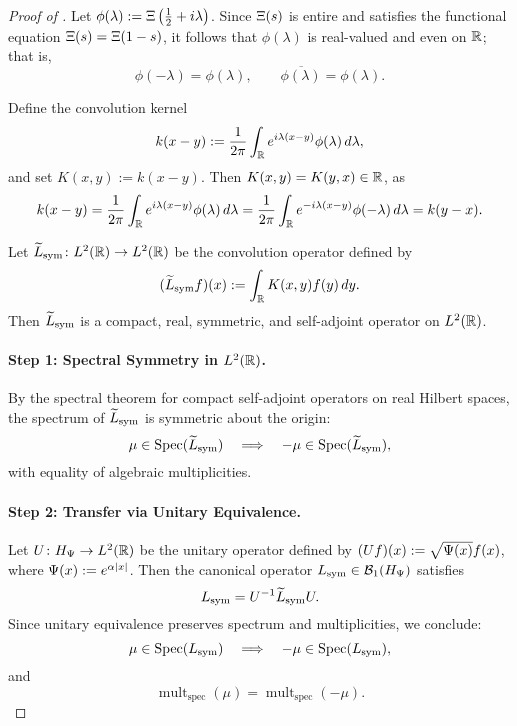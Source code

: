 \begin{proof}[Proof of ]
Let \( \phi(\lambda) := \Xi\left(\tfrac{1}{2} + i\lambda\right) \). Since \( \Xi(s) \) is entire and satisfies the functional equation \( \Xi(s) = \Xi(1 - s) \), it follows that \( \phi(\lambda) \) is real-valued and even on \( \mathbb{R} \); that is,
\[
\phi(-\lambda) = \phi(\lambda), \qquad \overline{\phi(\lambda)} = \phi(\lambda).
\]

Define the convolution kernel
\[
k(x - y) := \frac{1}{2\pi} \int_{\mathbb{R}} e^{i\lambda(x - y)} \phi(\lambda)\, d\lambda,
\]
and set \( K(x, y) := k(x - y) \). Then \( K(x, y) = K(y, x) \in \mathbb{R} \), as
\[
k(x - y) = \frac{1}{2\pi} \int_{\mathbb{R}} e^{i\lambda(x - y)} \phi(\lambda)\, d\lambda = \frac{1}{2\pi} \int_{\mathbb{R}} e^{-i\lambda(x - y)} \phi(-\lambda)\, d\lambda = k(y - x).
\]

Let \( \widetilde{L}_{\mathrm{sym}} \colon L^2(\mathbb{R}) \to L^2(\mathbb{R}) \) be the convolution operator defined by
\[
(\widetilde{L}_{\mathrm{sym}} f)(x) := \int_{\mathbb{R}} K(x, y) f(y)\, dy.
\]
Then \( \widetilde{L}_{\mathrm{sym}} \) is a compact, real, symmetric, and self-adjoint operator on \( L^2(\mathbb{R}) \).

\paragraph{Step 1: Spectral Symmetry in \( L^2(\mathbb{R}) \).}
By the spectral theorem for compact self-adjoint operators on real Hilbert spaces, the spectrum of \( \widetilde{L}_{\mathrm{sym}} \) is symmetric about the origin:
\[
\mu \in \operatorname{Spec}(\widetilde{L}_{\mathrm{sym}}) \quad \Longrightarrow \quad -\mu \in \operatorname{Spec}(\widetilde{L}_{\mathrm{sym}}),
\]
with equality of algebraic multiplicities.

\paragraph{Step 2: Transfer via Unitary Equivalence.}
Let \( U \colon H_{\Psi} \to L^2(\mathbb{R}) \) be the unitary operator defined by \( (Uf)(x) := \sqrt{\Psi(x)} f(x) \), where \( \Psi(x) := e^{\alpha |x|} \). Then the canonical operator \( L_{\mathrm{sym}} \in \mathcal{B}_1(H_{\Psi}) \) satisfies
\[
L_{\mathrm{sym}} = U^{-1} \widetilde{L}_{\mathrm{sym}} U.
\]
Since unitary equivalence preserves spectrum and multiplicities, we conclude:
\[
\mu \in \operatorname{Spec}(L_{\mathrm{sym}}) \quad \Longrightarrow \quad -\mu \in \operatorname{Spec}(L_{\mathrm{sym}}),
\]
and
\[
\operatorname{mult}_{\mathrm{spec}}(\mu) = \operatorname{mult}_{\mathrm{spec}}(-\mu).
\]
\end{proof}
